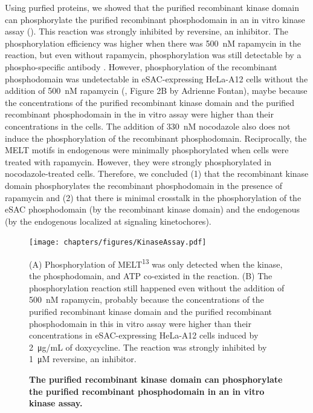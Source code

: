 Using purfied proteins, we showed that the purified recombinant  kinase domain can phosphorylate the purified recombinant  phosphodomain in an in vitro kinase assay (). This reaction was strongly inhibited by reversine, an  inhibitor. The phosphorylation efficiency was higher when there was \SI{500}{nM} rapamycin in the reaction, but even without rapamycin, phosphorylation was still detectable by a phospho-specific antibody \cite{MELTActivity}. However, phosphorylation of the recombinant phosphodomain was undetectable in eSAC-expressing HeLa-A12 cells without the addition of \SI{500}{nM} rapamycin (\cite{eSAC}, Figure 2B by Adrienne Fontan), maybe because the concentrations of the purified recombinant  kinase domain and the purified recombinant  phosphodomain in the in vitro assay were higher than their concentrations in the cells. The addition of \SI{330}{nM} nocodazole also does not induce the phosphorylation of the recombinant  phosphodomain. Reciprocally, the MELT motifs in endogenous  were minimally phosphorylated when cells were treated with rapamycin. However, they were strongly phosphorylated in nocodazole-treated cells. Therefore, we concluded (1) that the recombinant  kinase domain phosphorylates the recombinant  phosphodomain in the presence of rapamycin and (2) that there is minimal crosstalk in the phosphorylation of the eSAC phosphodomain (by the recombinant  kinase domain) and the endogenous  (by the endogenous  localized at signaling kinetochores).

\begin{figure}
    \centering
    \texttt{[image: chapters/figures/KinaseAssay.pdf]}
    \caption{\textbf{The purified recombinant  kinase domain can phosphorylate the purified recombinant  phosphodomain in an in vitro kinase assay.}}
    \noindent\justifying (A) Phosphorylation of MELT\textsuperscript{13} was only detected when the kinase, the phosphodomain, and ATP co-existed in the reaction. (B) The phosphorylation reaction still happened even without the addition of \SI{500}{nM} rapamycin, probably because the concentrations of the purified recombinant  kinase domain and the purified recombinant  phosphodomain in this in vitro assay were higher than their concentrations in eSAC-expressing HeLa-A12 cells induced by \SI{2}{\micro g/mL} of doxycycline. The reaction was strongly inhibited by \SI{1}{\micro M} reversine, an  inhibitor.
    \label{KinaseAssay}
\end{figure}

